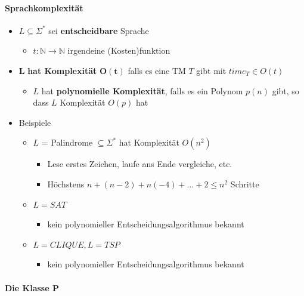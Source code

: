 \documentclass{scrartcl}
\begin{document}
\paragraph{Sprachkomplexität}

\begin{itemize}
	\item $L \subseteq \Sigma^*$ sei \textbf{entscheidbare} Sprache
	\begin{itemize}
		\item $t: \mathbb{N} \rightarrow \mathbb{N}$ irgendeine (Kosten)funktion
	\end{itemize}
	\item $\mathbf{L}$ \textbf{hat Komplexität} $\mathbf{O(t)}$ falls es eine TM $T$ gibt mit $time_T \in O(t)$
	\begin{itemize}
		\item $L$ hat \textbf{polynomielle Komplexität}, falls es ein Polynom $p(n)$ gibt, so dass $L$ Komplexität $O(p)$ hat
	\end{itemize}
	\item Beispiele
	\begin{itemize}
		\item $L$ = Palindrome $\subseteq \Sigma^*$ hat Komplexität $O(n^2)$
		\begin{itemize}
			\item Lese erstes Zeichen, laufe ans Ende vergleiche, etc.
			\item Höchstens $n+(n-2)+n(-4)+\ldots+2 \leq n^2$ Schritte
		\end{itemize}
		\item $L = SAT$
		\begin{itemize}
			\item kein polynomieller Entscheidungsalgorithmus bekannt
		\end{itemize}
		\item $L = CLIQUE, L = TSP$
		\begin{itemize}
			\item kein polynomieller Entscheidungsalgorithmus bekannt
		\end{itemize}
	\end{itemize}
\end{itemize}

\paragraph{Die Klasse P}
\end{document}
